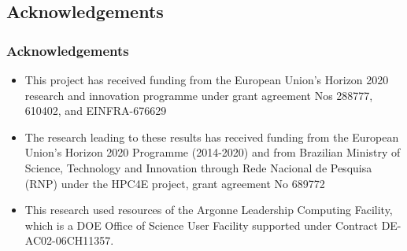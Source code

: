 \documentclass{beamer}
\begin{document}
\subsection{Acknowledgements}
\begin{frame}
  \frametitle{Acknowledgements}
  \begin{itemize}
    \item This project has received funding from the European Union's Horizon 2020 research and innovation programme under grant agreement Nos 288777, 610402, and EINFRA-676629
    \item The research leading to these results has received funding from the European Union’s Horizon 2020 Programme (2014-2020) and from Brazilian Ministry of Science, Technology and Innovation through Rede Nacional de Pesquisa (RNP) under the HPC4E project, grant agreement No 689772
    \item This research used resources of the Argonne Leadership Computing Facility, which is a DOE Office of Science User Facility supported under Contract DE-AC02-06CH11357.
  \end{itemize}
\end{frame}
\end{document}
